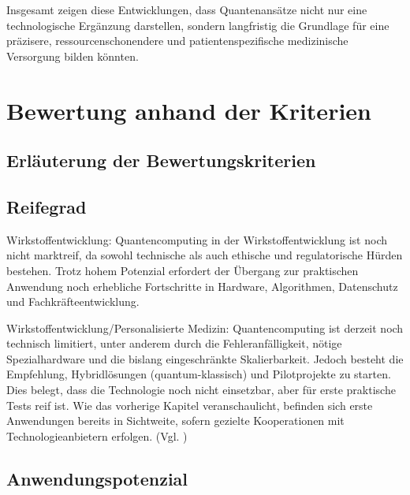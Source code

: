 Insgesamt zeigen diese Entwicklungen, dass Quantenansätze nicht nur eine technologische Ergänzung darstellen, sondern langfristig die Grundlage für eine präzisere, ressourcenschonendere und patientenspezifische medizinische Versorgung bilden könnten.



\section{Bewertung anhand der Kriterien}

\subsection*{Erläuterung der Bewertungskriterien}

\subsection{Reifegrad}
Wirkstoffentwicklung:
Quantencomputing in der Wirkstoffentwicklung ist noch nicht marktreif, da sowohl technische als auch ethische und regulatorische Hürden bestehen. Trotz hohem Potenzial erfordert der Übergang zur praktischen Anwendung noch erhebliche Fortschritte in Hardware, Algorithmen, Datenschutz und Fachkräfteentwicklung.\cite{flother_state_2023}

Wirkstoffentwicklung/Personalisierte Medizin:
Quantencomputing ist derzeit noch technisch limitiert, unter anderem durch die Fehleranfälligkeit, nötige Spezialhardware und die bislang eingeschränkte Skalierbarkeit. Jedoch besteht die Empfehlung, Hybridlösungen (quantum-klassisch) und  Pilotprojekte zu starten. Dies belegt, dass die Technologie noch nicht einsetzbar, aber für erste praktische Tests reif ist. Wie das vorherige Kapitel veranschaulicht, befinden sich erste Anwendungen bereits in Sichtweite, sofern gezielte Kooperationen mit Technologieanbietern erfolgen. (Vgl. \cite{jeyaraman_revolutionizing_2024})

\subsection{Anwendungspotenzial}

